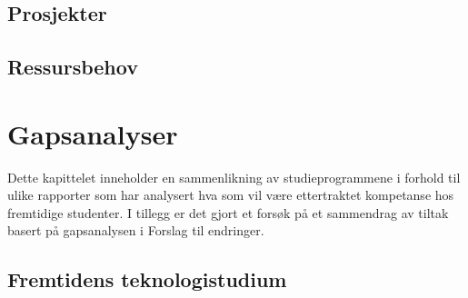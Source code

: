 \documentclass[a4paper, oneside, 12pt]{memoir}
\begin{document}
	

\section{Prosjekter}
	
	
	





\section{Ressursbehov}


\chapter{Gapsanalyser}

Dette kapittelet inneholder en sammenlikning av studieprogrammene i forhold til ulike rapporter som har analysert hva som vil være ettertraktet kompetanse hos fremtidige studenter. I tillegg er det gjort et forsøk på et sammendrag av tiltak basert på gapsanalysen i Forslag til endringer.



\section{Fremtidens teknologistudium}
	
	




\end{document}
